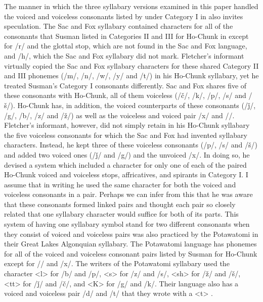 \documentclass[output=paper]{LSP/langsci}
\begin{document}
The manner in which the three syllabary versions examined in this paper handled the voiced and voiceless consonants listed by \citeauthor{Susman1939} under Category I in  also invites speculation. The Sac and Fox syllabary contained characters for all of the consonants that Susman listed in Categories II and III for Ho-Chunk in  except for /r/ and the glottal stop, which are not found in the Sac and Fox language, and /h/, which the Sac and Fox syllabary did not mark. Fletcher's informant virtually copied the Sac and Fox syllabary characters for these shared Category II and III phonemes (/m/, /n/, /w/, /y/ and /t/) in his Ho-Chunk syllabary, yet he treated Susman's Category I consonants differently. Sac and Fox shares five of these consonants with Ho-Chunk, all of them voiceless (/\v{c}/, /k/, /p/, /s/ and /\v{s}/). Ho-Chunk has, in addition, the voiced counterparts of these consonants (/\v{j}/, /g/, /b/, /z/ and /\v{z}/) as well as the voiceless and voiced pair /x/ and //.  Fletcher's informant, however, did not simply retain in his Ho-Chunk syllabary the five voiceless consonants for which the Sac and Fox had invented syllabary characters.  Instead, he kept three of these voiceless consonants (/p/, /s/ and /\v{s}/) and added two voiced ones (/\v{j}/ and /g/) and the unvoiced /x/. In doing so, he devised a system which included a character for only one of each of the paired Ho-Chunk voiced and voiceless stops, affricatives, and spirants in Category I. I assume that in writing he used the same character for both the voiced and voiceless consonants in a pair. Perhaps we can infer from this that he was aware that these consonants formed linked pairs and thought each pair so closely related that one syllabary character would suffice for both of its parts. This system of having one syllabary symbol stand for two different consonants when they consist of voiced and voiceless pairs was also practiced by the Potawatomi in their Great Lakes Algonquian syllabary. The Potawatomi language has phonemes for all of the voiced and voiceless consonant pairs listed by Susman for Ho-Chunk except for // and /x/. The writers of the Potawatomi syllabary used the character <l> for /b/ and /p/, <s> for /z/ and /s/, <sh> for /\v{z}/ and /\v{s}/, <tt> for /\v{j}/ and /\v{c}/, and <K> for /g/ and /k/. Their language also has a voiced and voiceless pair /d/ and /t/ that they wrote with a <t> \citep[172, Fig. 11]{Walker1996}.  
\end{document}

